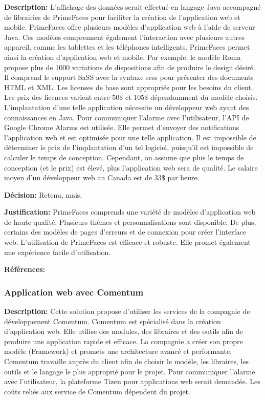 \textbf{Description:} L'affichage des données serait effectué en langage Java accompagné de librairies de PrimeFaces pour faciliter la création de l'application web et mobile. PrimeFaces offre plusieurs modèles d'application web à l'aide de serveur Java. Ces modèles comprennent également l'interaction avec plusieurs autres appareil, comme les tablettes et les téléphones intelligents. PrimeFaces permet ainsi la création d'application web et mobile. Par exemple, le modèle Roma propose plus de 1000 variations de dispositions afin de produire le design désiré. Il comprend le support SaSS avec la syntaxe scss pour présenter des documents HTML et XML. Les licenses de base sont appropriés pour les besoins du client. Les prix des licences varient entre 50\$ et 105\$ dépendamment du modèle choisis. L'implantation d'une telle application nécessite un développeur web ayant des connaissances en Java. Pour communiquer l'alarme avec l'utilisateur, l'API de Google Chrome Alarms est utilisée. Elle permet d'envoyer des notifications l'application web et est optimisée pour une telle application. Il est impossible de déterminer le prix de l'implantation d'un tel logiciel, puisqu'il est impossible de calculer le temps de conception. Cependant, on assume que plus le temps de conception (et le prix) est élevé, plus l'application web sera de qualité. Le salaire moyen d'un développeur web au Canada est de 33\$ par heure.

\textbf{Décision:} Retenu, mais.

\textbf{Justification:} PrimeFaces comprends une variété de modèles d'application web de haute qualité. Plusieurs thèmes et personnalisations sont disponible. De plus, certains des modèles de pages d'erreurs et de connexion pour créer l'interface web. L'utilisation de PrimeFaces est efficace et robuste. Elle promet également une expérience facile d'utilisation.

\textbf{Références:} \cite{PF} \cite{PF_Roma} \cite{PF_exemple} \cite{Dev_salary} \cite{Chrome_Alarm}

\subsubsection{Application web avec Comentum}

\textbf{Description:} Cette solution propose d'utiliser les services de la compagnie de développement Comentum. Comentum est spécialisé dans la création d'application web. Elle utilise des modules, des libraires et des outils afin de produire une application rapide et efficace. La compagnie a créer son propre modèle (Framework) et promets une architecture avancé et performante. Comentum travaille auprès du client afin de choisir le modèle, les libraires, les outils et le langage le plus approprié pour le projet. Pour communiquer l'alarme avec l'utilisateur, la plateforme Tizen pour applications web serait demandée. Les coûts reliés aux service de Comentum dépendent du projet.

